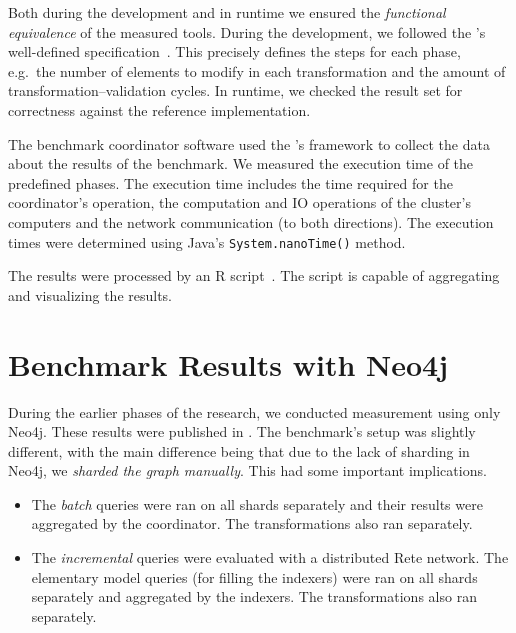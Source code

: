 Both during the development and in runtime we ensured the \emph{functional equivalence} of the measured tools. During the development, we followed the \tb{}'s well-defined specification~\cite{ASE2013}. This precisely defines the steps for each phase, e.g.\ the number of elements to modify in each transformation and the amount of transformation--validation cycles. In runtime, we checked the result set for correctness against the reference implementation. 

The benchmark coordinator software used the \tb{}'s framework to collect the data about the results of the benchmark. We measured the execution time of the predefined phases. The execution time includes the time required for the coordinator's operation, the computation and IO operations of the cluster's computers and the network communication (to both directions). The execution times were determined using Java's \texttt{System.nanoTime()} method.

The results were processed by an R script~\cite{RProject}. The script is capable of aggregating and visualizing the results. 


\section{Benchmark Results with Neo4j}
\label{benchmark-neo4j}

During the earlier phases of the research, we conducted measurement using only Neo4j. These results were published in \cite{Izso:2012:ODD:2428516.2428523}. The benchmark's setup was slightly different, with the main difference being that due to the lack of sharding in Neo4j, we \emph{sharded the graph manually}. This had some important implications.
  \begin{itemize}
    \item The \emph{batch} queries were ran on all shards separately and their results were aggregated by the coordinator. The transformations also ran separately. 
    \item The \emph{incremental} queries were evaluated with a distributed Rete network. The elementary model queries (for filling the indexers) were ran on all shards separately and aggregated by the indexers. The transformations also ran separately.

  \end{itemize}

